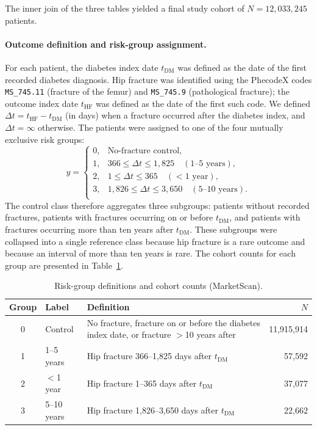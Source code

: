 \documentclass[12pt]{article}
\begin{document}
The inner join of the three tables yielded a final study cohort of $N = 12{,}033{,}245$ patients.

\paragraph{Outcome definition and risk-group assignment.}
For each patient, the diabetes index date $t_{\mathrm{DM}}$ was defined as the date of the first recorded diabetes diagnosis. Hip fracture was identified using the PhecodeX codes \texttt{MS\_745.11} (fracture of the femur) and \texttt{MS\_745.9} (pathological fracture); the outcome index date $t_{\mathrm{HF}}$ was defined as the date of the first such code. We defined $\Delta t = t_{\mathrm{HF}} - t_{\mathrm{DM}}$ (in days) when a fracture occurred after the diabetes index, and $\Delta t = \infty$ otherwise. The patients were assigned to one of the four mutually exclusive risk groups:
\begin{equation}
y =
\begin{cases}
0, & \text{No-fracture control,} \\[2pt]
1, & 366 \leq \Delta t \leq 1{,}825 \quad (1\text{--}5\text{ years}), \\[2pt]
2, & 1 \leq \Delta t \leq 365 \quad (<\!1\text{ year}), \\[2pt]
3, & 1{,}826 \leq \Delta t \leq 3{,}650 \quad (5\text{--}10\text{ years}). \\[2pt]
\end{cases}
\label{eq:risk-groups}
\end{equation}
The control class therefore aggregates three subgroups: patients without recorded fractures, patients with fractures occurring on or before $t_{\mathrm{DM}}$, and patients with fractures occurring more than ten years after $t_{\mathrm{DM}}$. These subgroups were collapsed into a single reference class because hip fracture is a rare outcome and because an interval of more than ten years is rare. The cohort counts for each group are presented in Table~\ref{tab:groups}.

\begin{table}[H]
\centering
\caption{Risk-group definitions and cohort counts (MarketScan).}
\label{tab:groups}
\begin{tabular}{clp{6cm}r}
\toprule
Group & Label & Definition & $N$ \\
\midrule
0 & Control     & No fracture, fracture on or before the diabetes index date, or fracture $>$10 years after & 11{,}915{,}914 \\
1 & 1--5 years  & Hip fracture 366--1{,}825 days after $t_{\mathrm{DM}}$ & 57{,}592 \\
2 & $<$1 year   & Hip fracture 1--365 days after $t_{\mathrm{DM}}$ & 37{,}077 \\
3 & 5--10 years & Hip fracture 1{,}826--3{,}650 days after $t_{\mathrm{DM}}$ & 22{,}662 \\
\bottomrule
\end{tabular}
\end{table}
\end{document}
